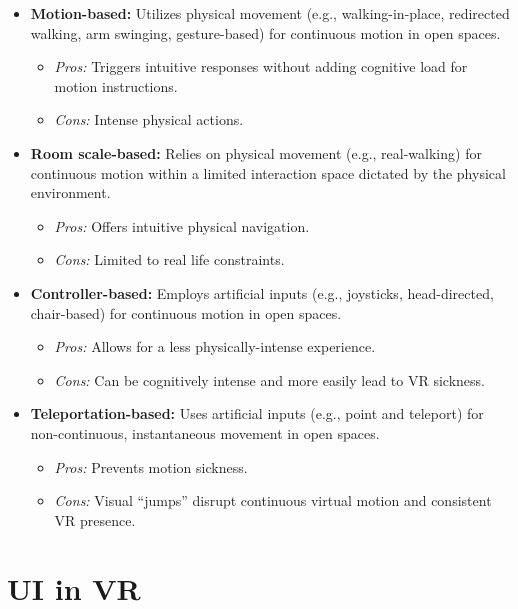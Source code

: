 \documentclass[inscr,ack,preface]{dithesis}
\begin{document}
\begin{itemize}
  \item \textbf{Motion-based:} Utilizes physical movement (e.g., walking-in-place, redirected walking, arm swinging, gesture-based) for continuous motion in open spaces.
        \begin{itemize}
          \item \textit{Pros:} Triggers intuitive responses without adding cognitive load for motion instructions.
          \item \textit{Cons:} Intense physical actions.
        \end{itemize}

  \item \textbf{Room scale-based:} Relies on physical movement (e.g., real-walking) for continuous motion within a limited interaction space dictated by the physical environment.
        \begin{itemize}
          \item \textit{Pros:} Offers intuitive physical navigation.
          \item \textit{Cons:} Limited to real life constraints.
        \end{itemize}

  \item \textbf{Controller-based:} Employs artificial inputs (e.g., joysticks, head-directed, chair-based) for continuous motion in open spaces.
        \begin{itemize}
          \item \textit{Pros:} Allows for a less physically-intense experience.
          \item \textit{Cons:} Can be cognitively intense and more easily lead to VR sickness.
        \end{itemize}

  \item \textbf{Teleportation-based:} Uses artificial inputs (e.g., point and teleport) for non-continuous, instantaneous movement in open spaces.
        \begin{itemize}
          \item \textit{Pros:} Prevents motion sickness.
          \item \textit{Cons:} Visual ``jumps'' disrupt continuous virtual motion and consistent VR presence.
        \end{itemize}
\end{itemize}

\section{UI in VR}
\end{document}

